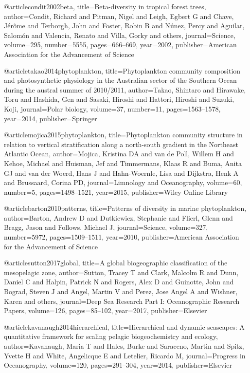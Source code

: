 {{{{{{{{{@article{condit2002beta,
  title={Beta-diversity in tropical forest trees},
  author={Condit, Richard and Pitman, Nigel and Leigh, Egbert G and Chave, J{\'e}r{\^o}me and Terborgh, John and Foster, Robin B and N{\'u}nez, Percy and Aguilar, Salom{\'o}n and Valencia, Renato and Villa, Gorky and others},
  journal={Science},
  volume={295},
  number={5555},
  pages={666--669},
  year={2002},
  publisher={American Association for the Advancement of Science}
}

@article{takao2014phytoplankton,
  title={Phytoplankton community composition and photosynthetic physiology in the Australian sector of the Southern Ocean during the austral summer of 2010/2011},
  author={Takao, Shintaro and Hirawake, Toru and Hashida, Gen and Sasaki, Hiroshi and Hattori, Hiroshi and Suzuki, Koji},
  journal={Polar biology},
  volume={37},
  number={11},
  pages={1563--1578},
  year={2014},
  publisher={Springer}
}

@article{mojica2015phytoplankton,
  title={Phytoplankton community structure in relation to vertical stratification along a north-south gradient in the Northeast Atlantic Ocean},
  author={Mojica, Kristina DA and van de Poll, Willem H and Kehoe, Michael and Huisman, Jef and Timmermans, Klaas R and Buma, Anita GJ and van der Woerd, Hans J and Hahn-Woernle, Lisa and Dijkstra, Henk A and Brussaard, Corina PD},
  journal={Limnology and Oceanography},
  volume={60},
  number={5},
  pages={1498--1521},
  year={2015},
  publisher={Wiley Online Library}
}

@article{barton2010patterns,
  title={Patterns of diversity in marine phytoplankton},
  author={Barton, Andrew D and Dutkiewicz, Stephanie and Flierl, Glenn and Bragg, Jason and Follows, Michael J},
  journal={Science},
  volume={327},
  number={5972},
  pages={1509--1511},
  year={2010},
  publisher={American Association for the Advancement of Science}
}

@article{sutton2017global,
  title={A global biogeographic classification of the mesopelagic zone},
  author={Sutton, Tracey T and Clark, Malcolm R and Dunn, Daniel C and Halpin, Patrick N and Rogers, Alex D and Guinotte, John and Bograd, Steven J and Angel, Martin V and Perez, Jose Angel A and Wishner, Karen and others},
  journal={Deep Sea Research Part I: Oceanographic Research Papers},
  volume={126},
  pages={85--102},
  year={2017},
  publisher={Elsevier}
}


@article{kavanaugh2014hierarchical,
  title={Hierarchical and dynamic seascapes: A quantitative framework for scaling pelagic biogeochemistry and ecology},
  author={Kavanaugh, Maria T and Hales, Burke and Saraceno, Martin and Spitz, Yvette H and White, Angelicque E and Letelier, Ricardo M},
  journal={Progress in Oceanography},
  volume={120},
  pages={291--304},
  year={2014},
  publisher={Elsevier}
}


}}}}}}}}}
